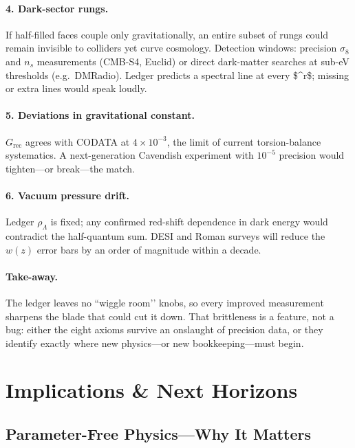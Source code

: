 \documentclass[11pt]{article}
\begin{document}
\paragraph{4. Dark-sector rungs.}
If half-filled faces couple only gravitationally, an entire subset of rungs
could remain invisible to colliders yet curve cosmology.  Detection windows:
precision $\sigma_{8}$ and $n_{s}$ measurements (CMB-S4, Euclid) or direct
dark-matter searches at sub-eV thresholds (e.g.\ DMRadio).  Ledger predicts a
spectral line at every \$\varphi^{r}\;\$; missing or
extra lines would speak loudly.

\paragraph{5. Deviations in gravitational constant.}
$G_{\text{rec}}$ agrees with CODATA at $4\times10^{-3}$, the limit of current
torsion-balance systematics.  A next-generation Cavendish experiment with
$10^{-5}$ precision would tighten—or break—the match.

\paragraph{6. Vacuum pressure drift.}
Ledger $\rho_\Lambda$ is fixed; any confirmed red-shift dependence in dark
energy would contradict the half-quantum sum.  DESI and Roman surveys will
reduce the $w(z)$ error bars by an order of magnitude within a decade.

\paragraph{Take-away.}
The ledger leaves no “wiggle room’’ knobs, so every improved measurement
sharpens the blade that could cut it down.  That brittleness is a feature, not
a bug: either the eight axioms survive an onslaught of precision data, or they
identify exactly where new physics—or new bookkeeping—must begin.


\section{Implications \& Next Horizons}
\label{sec:implications}

\subsection*{Parameter-Free Physics—Why It Matters}
\end{document}
